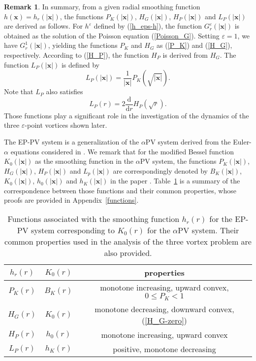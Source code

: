 \documentclass{article}
\theoremstyle{definition}
\newtheorem{remark}[theorem]{Remark}
\begin{document}
\begin{remark}
In summary, from a given radial smoothing function $h({\bm x})=h_r(\vert {\bm x} \vert )$, the functions $P_K( \vert {\bm x} \vert)$, $H_G(\vert{\bm x}\vert)$, $H_P(\vert {\bm x} \vert)$
and $L_P(\vert {\bm x} \vert)$ are derived as follows. For $h^\varepsilon$ defined by (\ref{h_eps-h}),  the function $G_r^\varepsilon( \vert {\bm x} \vert)$ is
obtained as the solution of the Poisson equation (\ref{Poisson_G}). Setting $\varepsilon=1$, we have $G_r^1(\vert{\bm x}\vert)$, yielding the functions $P_K$ and $H_G$
as (\ref{P_K}) and (\ref{H_G}), respectively. According to (\ref{H_P}), the function $H_P$ is derived from $H_G$. The function $L_P(\vert{\bm x}\vert)$ is defined by
\begin{equation}
L_P(\vert{\bm x}\vert) = \frac{1}{\vert {\bm x}\vert} P_K\left(\sqrt{\vert {\bm x} \vert}\right).
\label{L_P}
\end{equation}
Note that $L_P$ also satisfies
\begin{equation}
L_P(r) = 2 \frac{\mbox{d}}{\mbox{d}r}H_P(\sqrt{r}).
\label{dL_p}
\end{equation}
Those functions play a significant role in the investigation of the dynamics of the three $\varepsilon$-point vortices  shown later. 

The EP-PV system is a generalization of the $\alpha$PV system derived from the Euler-$\alpha$ equations considered in \cite{G.2}. 
 We remark that  for the modified Bessel function $K_0(\vert{\bm x}\vert)$ as the smoothing function in  the $\alpha$PV system, the functions $P_K(\vert{\bm x}\vert)$, $H_G(\vert{\bm x}\vert)$, $H_P(\vert{\bm x}\vert)$ and $L_p(\vert{\bm x}\vert)$ are correspondingly  denoted by  $B_K(\vert {\bm x} \vert)$, 
 $K_0(\vert{\bm x}\vert)$, $h_0(\vert{\bm x}\vert)$ and $h_K(\vert{\bm x}\vert)$ in the paper \cite{G.2}. Table~\ref{Tab_Function} is a summary of the correspondence between those functions and their common properties, whose proofs are  provided in Appendix~\ref{functions}.
 \end{remark}
 \begin{table}
 \centering
 \begin{tabular}{|c|c|c|} \hline
 $h_r(r)$ &  $K_0(r)$ & properties \\ \hline
 $P_K(r)$ & $B_K(r)$ & monotone increasing, upward convex, $0 \leq P_K < 1$ \\
 $H_G(r)$ & $K_0(r)$ & monotone decreasing, downward convex, (\ref{H_G-zero}) \\ 
  $H_P(r)$ & $h_0(r)$ & monotone increasing, upward convex  \\
  $L_P(r)$ & $h_K(r)$ & positive, monotone decreasing \\ \hline
 \end{tabular}
 \caption{Functions associated with the smoothing function $h_r(r)$ for the EP-PV system corresponding to $K_0(r)$ for the $\alpha$PV system. Their common properties used in 
 the analysis of the three vortex problem are also provided.}
 \label{Tab_Function}
 \end{table}
\end{document}
